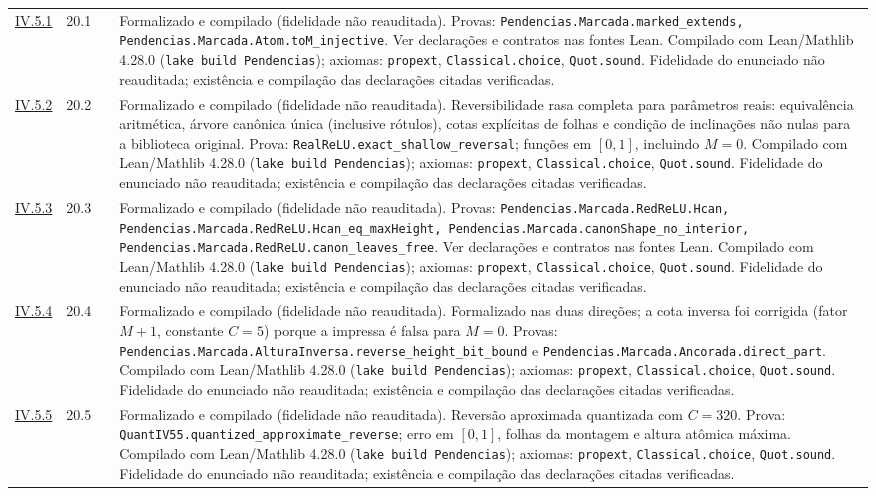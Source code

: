 \documentclass[12pt,a4paper]{article}
\theoremstyle{preciso}
\theoremstyle{definition}
\newcommand{\code}[1]{\nolinkurl{#1}}
\theoremstyle{preciso}
\theoremstyle{preciso}
\theoremstyle{preciso}
\theoremstyle{preciso}
\theoremstyle{definition}
\theoremstyle{preciso}
\theoremstyle{definition}
\theoremstyle{preciso}
\theoremstyle{preciso}
\theoremstyle{definition}
\begin{document}
\begin{singlespace}
\begin{longtable}{@{}p{.11\linewidth}p{.09\linewidth}p{.09\linewidth}p{.59\linewidth}@{}}
\hyperref[map:artigo_3:5.1]{IV.5.1} & 20.1 & \pageref{map:artigo_3:5.1} & Formalizado e compilado (fidelidade não reauditada). Provas: \code{Pendencias.Marcada.marked_extends, Pendencias.Marcada.Atom.toM_injective}. Ver declarações e contratos nas fontes Lean. Compilado com Lean/Mathlib 4.28.0 (\texttt{lake build Pendencias}); axiomas: \texttt{propext}, \texttt{Classical.choice}, \texttt{Quot.sound}. Fidelidade do enunciado não reauditada; existência e compilação das declarações citadas verificadas.\\[4pt]
\hyperref[map:artigo_3:5.2]{IV.5.2} & 20.2 & \pageref{map:artigo_3:5.2} & Formalizado e compilado (fidelidade não reauditada). Reversibilidade rasa completa para parâmetros reais: equivalência aritmética, árvore canônica única (inclusive rótulos), cotas explícitas de folhas e condição de inclinações não nulas para a biblioteca original. Prova: \code{RealReLU.exact_shallow_reversal}; funções em $[0,1]$, incluindo $M=0$. Compilado com Lean/Mathlib 4.28.0 (\texttt{lake build Pendencias}); axiomas: \texttt{propext}, \texttt{Classical.choice}, \texttt{Quot.sound}. Fidelidade do enunciado não reauditada; existência e compilação das declarações citadas verificadas.\\[4pt]
\hyperref[map:artigo_3:5.3]{IV.5.3} & 20.3 & \pageref{map:artigo_3:5.3} & Formalizado e compilado (fidelidade não reauditada). Provas: \code{Pendencias.Marcada.RedReLU.Hcan, Pendencias.Marcada.RedReLU.Hcan_eq_maxHeight, Pendencias.Marcada.canonShape_no_interior, Pendencias.Marcada.RedReLU.canon_leaves_free}. Ver declarações e contratos nas fontes Lean. Compilado com Lean/Mathlib 4.28.0 (\texttt{lake build Pendencias}); axiomas: \texttt{propext}, \texttt{Classical.choice}, \texttt{Quot.sound}. Fidelidade do enunciado não reauditada; existência e compilação das declarações citadas verificadas.\\[4pt]
\hyperref[map:artigo_3:5.4]{IV.5.4} & 20.4 & \pageref{map:artigo_3:5.4} & Formalizado e compilado (fidelidade não reauditada). Formalizado nas duas direções; a cota inversa foi corrigida (fator $M+1$, constante $C=5$) porque a impressa é falsa para $M=0$. Provas: \code{Pendencias.Marcada.AlturaInversa.reverse_height_bit_bound} e \code{Pendencias.Marcada.Ancorada.direct_part}. Compilado com Lean/Mathlib 4.28.0 (\texttt{lake build Pendencias}); axiomas: \texttt{propext}, \texttt{Classical.choice}, \texttt{Quot.sound}. Fidelidade do enunciado não reauditada; existência e compilação das declarações citadas verificadas.\\[4pt]
\hyperref[map:artigo_3:5.5]{IV.5.5} & 20.5 & \pageref{map:artigo_3:5.5} & Formalizado e compilado (fidelidade não reauditada). Reversão aproximada quantizada com $C=320$. Prova: \code{QuantIV55.quantized_approximate_reverse}; erro em $[0,1]$, folhas da montagem e altura atômica máxima. Compilado com Lean/Mathlib 4.28.0 (\texttt{lake build Pendencias}); axiomas: \texttt{propext}, \texttt{Classical.choice}, \texttt{Quot.sound}. Fidelidade do enunciado não reauditada; existência e compilação das declarações citadas verificadas.\\[4pt]

\end{longtable}
\end{singlespace}
\end{document}
